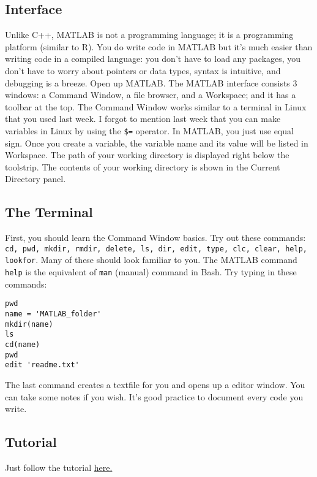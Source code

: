 \documentclass{article}
\begin{document}
\subsection{Interface}
Unlike C++, MATLAB is not a programming language; it is a programming platform (similar to R). You do write code in MATLAB but it's much easier than writing code in a compiled language: you don't have to load any packages, you don't have to worry about pointers or data types, syntax is intuitive, and debugging is a breeze. Open up MATLAB. The MATLAB interface consists 3 windows: a Command Window, a file browser, and a Workspace; and it has a toolbar at the top. The Command Window works similar to a terminal in Linux that you used last week. I forgot to mention last week that you can make variables in Linux by using the \texttt{\$=} operator. In MATLAB, you just use equal sign. Once you create a variable, the variable name and its value will be listed in Workspace. The path of your working directory is displayed right below the toolstrip. The contents of your working directory is shown in the Current Directory panel.

\subsection{The Terminal}
First, you should learn the Command Window basics. Try out these commands: \texttt{cd, pwd, mkdir, rmdir, delete, ls, dir, edit, type, clc, clear, help, lookfor}. Many of these should look familiar to you. The MATLAB command \texttt{help} is the equivalent of \texttt{man} (manual) command in Bash. Try typing in these commands:
\begin{verbatim}
pwd
name = 'MATLAB_folder'
mkdir(name)
ls
cd(name)
pwd
edit 'readme.txt'
\end{verbatim}
The last command creates a textfile for you and opens up a editor window. You can take some notes if you wish. It's good practice to document every code you write.

\subsection{Tutorial}
Just follow the tutorial \href{https://www.mathworks.com/help/matlab/learn_matlab/desktop.html}{here.}
\end{document}
